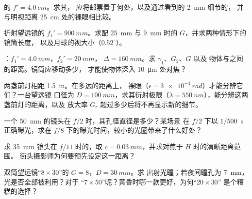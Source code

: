 \begin{exercise}[$\star$]\label{exo:b1:optical-instruments:3}
的 $f' = \qty{4.0}{cm}$。求其，
应将邮票置于何处，以及通过看到的 \qty{2}{mm} 细节的，
并与明视距离 \qty{25}{cm} 处的裸眼相比较。
\end{exercise}

\begin{exercise}[$\star$]\label{exo:b1:optical-instruments:4}
折射望远镜的 $f_1' = \qty{900}{mm}$。求配 \qty{25}{mm}
与 \qty{9}{mm} 时的 $G$，并求两种情形下的镜筒长度，
以及月球的视大小（$0.52^\circ$）。
\end{exercise}

\begin{exercise}[$\star\star$]\label{exo:b1:optical-instruments:5}
：$f_1' = \qty{4.0}{mm}$，$f_2' = \qty{20}{mm}$，
$\Delta = \qty{160}{mm}$。求 $\gamma_1$、$G_2$、$G$ 以及
物体与之间的距离。镜筒应移动多少，
才能使物体深入 \qty{10}{\micro m} 处对焦？
\end{exercise}

\begin{exercise}[$\star\star$]\label{exo:b1:optical-instruments:6}
两盏前灯相距 \qty{1.5}{m}。在多远的距离上，
裸眼（$\epsilon = \qty{3e-4}{rad}$）才能分辨它们？一台望远镜
口径为 $D = \qty{100}{mm}$，求其衍射极限（$\lambda =
\qty{550}{nm}$），能分辨这两盏前灯的距离，以及
放大率 $G_r$ 超过多少后将不再显示新的细节。
\end{exercise}

\begin{exercise}[$\star\star$]\label{exo:b1:optical-instruments:7}
一个 \qty{50}{mm} 的镜头在 $f/2$ 时，其孔径直径是多少？某场景
在 $f/2$ 下以 $1/500$~\unit{s} 正确曝光，求在
$f/8$ 下的曝光时间，较小的光圈带来了什么好处？
\end{exercise}

\begin{exercise}[$\star\star$]\label{exo:b1:optical-instruments:8}
求 \qty{35}{mm} 镜头在 $f/11$ 时的，取
$c = \qty{0.03}{mm}$，并求对焦于 $H$ 时的清晰距离范围。
街头摄影师为何要预先设定这一距离？
\end{exercise}

\begin{exercise}[$\star\star$]\label{exo:b1:optical-instruments:9}
双筒望远镜“$8\times30$”的 $G = 8$，$D = \qty{30}{mm}$。求
出射光瞳；若夜间瞳孔为 \qty{7}{mm}，光是否全部被利用？对于
“$7\times50$”呢？黄昏时哪一款更好，为何“$20\times30$”
是个糟糕的选择？
\end{exercise}

